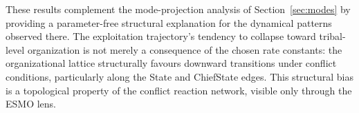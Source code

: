 These results complement the mode-projection analysis of
Section~\ref{sec:modes} by providing a parameter-free structural
explanation for the dynamical patterns observed there.  The exploitation
trajectory's tendency to collapse toward tribal-level organization is not
merely a consequence of the chosen rate constants: the organizational
lattice structurally favours downward transitions under conflict conditions,
particularly along the State and ChiefState edges.  This structural bias
is a topological property of the conflict reaction network, visible only
through the ESMO lens.
